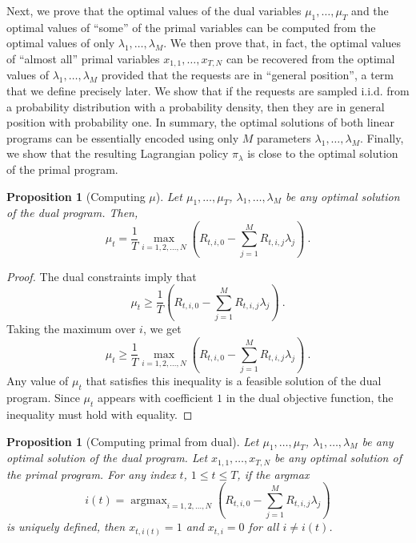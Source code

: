 \documentclass[12pt]{article}
\DeclareMathOperator*{\argmax}{argmax}
\newtheorem{proposition}[theorem]{Proposition}
\theoremstyle{definition}
\begin{document}
Next, we prove that the optimal values of the dual variables $\mu_1, \dots,
\mu_T$ and the optimal values of ``some'' of the primal variables can be
computed from the optimal values of only $\lambda_1, \dots, \lambda_M$. We then
prove that, in fact, the optimal values of ``almost all'' primal variables
$x_{1,1}, \dots, x_{T,N}$ can be recovered from the optimal values of
$\lambda_1, \dots, \lambda_M$ provided that the requests are in ``general
position'', a term that we define precisely later. We show that if the requests
are sampled i.i.d. from a probability distribution with a probability density,
then they are in general position with probability one. In summary, the optimal
solutions of both linear programs can be essentially encoded using only $M$
parameters $\lambda_1, \dots, \lambda_M$. Finally, we show that the resulting
Lagrangian policy $\pi_\lambda$ is close to the optimal solution of the primal
program.

\begin{proposition}[Computing $\mu$]
\label{proposition:computing-mu}
Let $\mu_1, \dots, \mu_T$, $\lambda_1, \dots, \lambda_M$ be any optimal solution
of the dual program. Then,
$$
\mu_t = \frac{1}{T} \max_{i=1,2,\dots,N} \left( R_{t,i,0} - \sum_{j=1}^M R_{t,i,j} \lambda_j \right) \: .
$$
\end{proposition}

\begin{proof}
The dual constraints imply that
$$
\mu_t \ge \frac{1}{T} \left( R_{t,i,0} - \sum_{j=1}^M R_{t,i,j} \lambda_j \right) \: .
$$
Taking the maximum over $i$, we get
$$
\mu_t \ge \frac{1}{T} \max_{i=1,2,\dots,N} \left( R_{t,i,0} - \sum_{j=1}^M R_{t,i,j} \lambda_j \right) \: .
$$
Any value of $\mu_t$ that satisfies this inequality is a feasible solution of
the dual program. Since $\mu_t$ appears with coefficient $1$ in the dual
objective function, the inequality must hold with equality.
\end{proof}

\begin{proposition}[Computing primal from dual]
\label{proposition:computing-primal-from-dual}
Let $\mu_1, \dots, \mu_T$, $\lambda_1, \dots, \lambda_M$ be any optimal solution
of the dual program. Let $x_{1,1}, \dots, x_{T,N}$ be any optimal solution of
the primal program. For any index $t$, $1 \le t \le T$, if the argmax
$$
i(t) = \argmax_{i=1,2,\dots,N} \left( R_{t,i,0} - \sum_{j=1}^M R_{t,i,j} \lambda_j \right)
$$
is uniquely defined, then $x_{t,i(t)} = 1$ and $x_{t,i} = 0$ for all $i \neq i(t)$.
\end{proposition}
\end{document}
